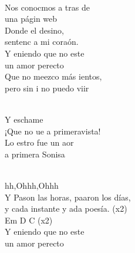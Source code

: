 \documentclass[12pt]{article}
\begin{document}
\begin{multicols*}{2}
        \begin{cancion}%
                {}\vspace*{-0.4cm}\\
                        Nos conocmos a tras de  \\
                        una págin web\\
                        Donde el desino, \\
                        sentenc a mi coraón. \\
                \jump
                        Y eniendo que no este \\
                        un amor perecto\\
                        Que no meezco más ientos, \\
                        pero sin i no puedo viir\\\jump\\
                        \begin{chorus}%
                        Y eschame  \\
                        ¡Que no ue a primeravista!\\
                        Lo estro fue un aor \\
                        a primera Sonisa\\
                        \end{chorus}%
                        \jump\\
                        hh,Ohhh,Ohhh       \\
                \jump
                        Y Pason las horas, paaron los días,\\
                        y cada instante y ada poesía. (x2)\\
                Em D C (x2)\\
                \jump
                        Y eniendo que no este \\
                        un amor perecto\\

\end{cancion}
\end{multicols*}
\end{document}
